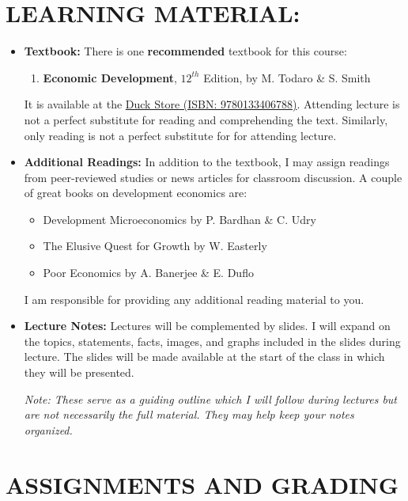 \documentclass[11pt]{article}
\begin{document}
\section*{LEARNING MATERIAL:}
\begin{itemize}
    \item \textbf{Textbook:} There is one \textbf{recommended} textbook for this course:
        \begin{enumerate}
            \item[\faBook] \textbf{Economic Development}, $12^{th}$ Edition, by M. Todaro \& S. Smith
        \end{enumerate}
    It is available at the \href{https://www.uoduckstore.com/book-search-results?crn=11737&term=202501}{Duck Store (ISBN: 9780133406788)}.
    Attending lecture is not a perfect substitute for reading and comprehending the text. 
    Similarly, only reading is not a perfect substitute for for attending lecture. 
    \item \textbf{Additional Readings:} In addition to the textbook, I may assign readings from peer-reviewed studies or news articles for classroom discussion. A couple of great books on development economics are:
        \begin{itemize}
            \item[\faBook] Development Microeconomics by P. Bardhan \& C. Udry
            \item[\faBook] The Elusive Quest for Growth by W. Easterly
            \item[\faBook] Poor Economics by A. Banerjee \& E. Duflo
        \end{itemize}
    I am responsible for providing any additional reading material to you.
    \item \textbf{Lecture Notes:} Lectures will be complemented by slides.  
    I will expand on the topics, statements, facts, images, and graphs included in the slides during lecture. 
    The slides will be made available at the start of the class in which they will be presented. 
    
    \emph{Note: These serve as a guiding outline which I will follow during lectures but are not necessarily the full material. They may help keep your notes organized.}
\end{itemize}

\section*{ASSIGNMENTS AND GRADING}
\end{document}
